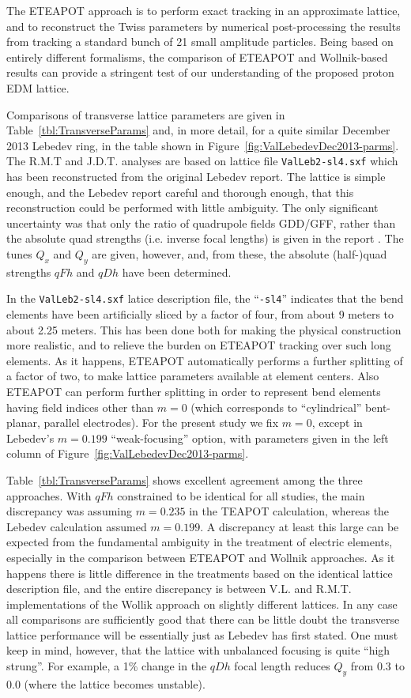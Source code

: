 \documentclass[12]{article}
\begin{document}
The ETEAPOT approach is to perform exact tracking in an approximate lattice, 
and to reconstruct the Twiss parameters by numerical post-processing the 
results from tracking a standard bunch of 21 small amplitude particles.
Being based on entirely different formalisms, the comparison of ETEAPOT and
Wollnik-based results can provide a stringent test of our understanding of 
the proposed proton EDM lattice.

Comparisons of transverse lattice parameters are given in Table~\ref{tbl:TransverseParams}
and, in more detail, for a quite similar December 2013 Lebedev ring, in the table shown in 
Figure~\ref{fig:ValLebedevDec2013-parms}.
The R.M.T and J.D.T. analyses are based on lattice file {\tt ValLeb2-sl4.sxf} which
has been reconstructed from the original Lebedev\cite{ValLeb2} report. The lattice
is simple enough, and the Lebedev report careful and thorough enough, that this
reconstruction could be performed with little ambiguity. The only significant
uncertainty was that only the ratio of quadrupole fields GDD/GFF, rather than
the absolute quad strengths (i.e. inverse focal lengths) is given in the report 
\cite{ValLeb2}. The tunes $Q_x$ and $Q_y$ are given, however, and, from these, 
the absolute (half-)quad strengths $qFh$ and $qDh$ have been determined.

In the {\tt ValLeb2-sl4.sxf} latice description file, the ``{\tt -sl4}'' indicates
that the bend elements have been artificially sliced by a factor of four, from
about 9 meters to about 2.25 meters. This has been done both for making the
physical construction more realistic, and to relieve the burden on ETEAPOT tracking
over such long elements. As it happens, ETEAPOT automatically performs a further
splitting of a factor of two, to make lattice parameters available at element
centers. Also ETEAPOT can perform further splitting in order to represent bend
elements having field indices other than $m=0$ (which corresponds to ``cylindrical''
bent-planar, parallel electrodes). For the present study we fix $m=0$, except in
Lebedev's $m=0.199$ ``weak-focusing'' option, with parameters given in the left column
of Figure~\ref{fig:ValLebedevDec2013-parms}.

Table~\ref{tbl:TransverseParams} shows excellent agreement among the three approaches.
With $qFh$ constrained to be identical for all studies, the main discrepancy was
assuming $m=0.235$ in the TEAPOT calculation, whereas the Lebedev calculation
assumed $m=0.199$.
A discrepancy at least this large can be expected from the fundamental ambiguity
in the treatment of electric elements, especially in the comparison between
ETEAPOT and Wollnik approaches.  As it happens there is little
difference in the treatments based on the identical lattice description file, 
and the entire discrepancy is between V.L. and R.M.T. implementations of 
the Wollik approach on slightly different lattices. In any case all
comparisons are sufficiently good that there can be little doubt the
transverse lattice performance will be essentially just as Lebedev has 
first stated. One must keep in mind, however, that the lattice with 
unbalanced focusing is quite ``high strung''.  For example, a 1\%
change in the $qDh$ focal length reduces $Q_y$ from 0.3 to 0.0 (where
the lattice becomes unstable). 
\end{document}
